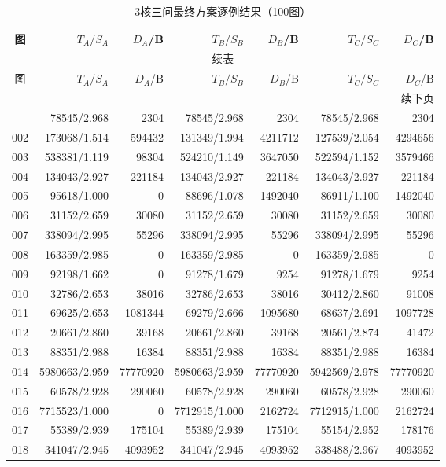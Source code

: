 \begin{longtable}{crrrrrr}
\caption{3核三问最终方案逐例结果（100图）}\label{tab:v7-detail-3}\\
\toprule
图 & $T_A/S_A$ & $D_A$/B & $T_B/S_B$ & $D_B$/B & $T_C/S_C$ & $D_C$/B \\
\midrule
\endfirsthead
\multicolumn{7}{c}{续表}\\
\toprule
图 & $T_A/S_A$ & $D_A$/B & $T_B/S_B$ & $D_B$/B & $T_C/S_C$ & $D_C$/B \\
\midrule
\endhead
\midrule\multicolumn{7}{r}{续下页}\\
\endfoot
\bottomrule
\endlastfoot
001 & 78545/2.968 & 2304 & 78545/2.968 & 2304 & 78545/2.968 & 2304 \\
002 & 173068/1.514 & 594432 & 131349/1.994 & 4211712 & 127539/2.054 & 4294656 \\
003 & 538381/1.119 & 98304 & 524210/1.149 & 3647050 & 522594/1.152 & 3579466 \\
004 & 134043/2.927 & 221184 & 134043/2.927 & 221184 & 134043/2.927 & 221184 \\
005 & 95618/1.000 & 0 & 88696/1.078 & 1492040 & 86911/1.100 & 1492040 \\
006 & 31152/2.659 & 30080 & 31152/2.659 & 30080 & 31152/2.659 & 30080 \\
007 & 338094/2.995 & 55296 & 338094/2.995 & 55296 & 338094/2.995 & 55296 \\
008 & 163359/2.985 & 0 & 163359/2.985 & 0 & 163359/2.985 & 0 \\
009 & 92198/1.662 & 0 & 91278/1.679 & 9254 & 91278/1.679 & 9254 \\
010 & 32786/2.653 & 38016 & 32786/2.653 & 38016 & 30412/2.860 & 91008 \\
011 & 69625/2.653 & 1081344 & 69279/2.666 & 1095680 & 68637/2.691 & 1097728 \\
012 & 20661/2.860 & 39168 & 20661/2.860 & 39168 & 20561/2.874 & 41472 \\
013 & 88351/2.988 & 16384 & 88351/2.988 & 16384 & 88351/2.988 & 16384 \\
014 & 5980663/2.959 & 77770920 & 5980663/2.959 & 77770920 & 5942569/2.978 & 77770920 \\
015 & 60578/2.928 & 290060 & 60578/2.928 & 290060 & 60578/2.928 & 290060 \\
016 & 7715523/1.000 & 0 & 7712915/1.000 & 2162724 & 7712915/1.000 & 2162724 \\
017 & 55389/2.939 & 175104 & 55389/2.939 & 175104 & 55154/2.952 & 178176 \\
018 & 341047/2.945 & 4093952 & 341047/2.945 & 4093952 & 338488/2.967 & 4093952 \\

\end{longtable}
